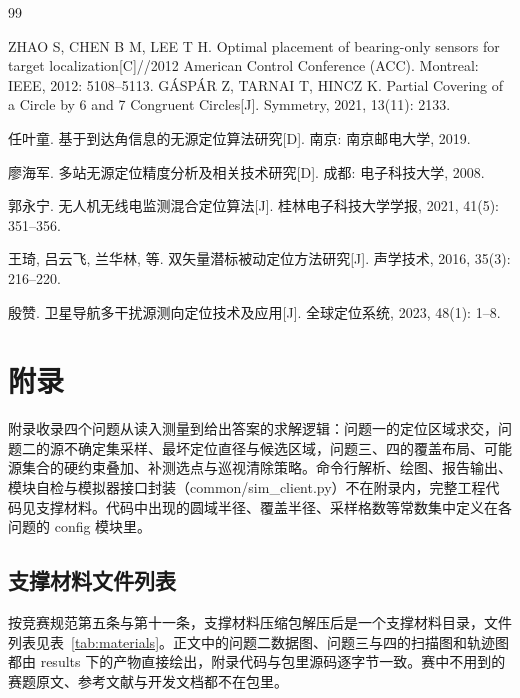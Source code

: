 \documentclass[UTF8, zihao=5,AutoFakeBold=2]{ctexart}
\begin{document}


\newpage
\begin{thebibliography}{99}
    
	 ZHAO S, CHEN B M, LEE T H. Optimal placement of bearing-only sensors for target localization[C]//2012 American Control Conference (ACC). Montreal: IEEE, 2012: 5108--5113.
     GÁSPÁR Z, TARNAI T, HINCZ K. Partial Covering of a Circle by 6 and 7 Congruent Circles[J]. Symmetry, 2021, 13(11): 2133.

	 任叶童. 基于到达角信息的无源定位算法研究[D]. 南京: 南京邮电大学, 2019.

	 廖海军. 多站无源定位精度分析及相关技术研究[D]. 成都: 电子科技大学, 2008.

	 郭永宁. 无人机无线电监测混合定位算法[J]. 桂林电子科技大学学报, 2021, 41(5): 351--356.

	 王琦, 吕云飞, 兰华林, 等. 双矢量潜标被动定位方法研究[J]. 声学技术, 2016, 35(3): 216--220.

	 殷赞. 卫星导航多干扰源测向定位技术及应用[J]. 全球定位系统, 2023, 48(1): 1--8.

\end{thebibliography}

\section*{附录}

	\noindent 附录收录四个问题从读入测量到给出答案的求解逻辑：问题一的定位区域求交，问题二的源不确定集采样、最坏定位直径与候选区域，问题三、四的覆盖布局、可能源集合的硬约束叠加、补测选点与巡视清除策略。命令行解析、绘图、报告输出、模块自检与模拟器接口封装（common/sim\_client.py）不在附录内，完整工程代码见支撑材料。代码中出现的圆域半径、覆盖半径、采样格数等常数集中定义在各问题的 config 模块里。

\subsection*{支撑材料文件列表}

	\noindent 按竞赛规范第五条与第十一条，支撑材料压缩包解压后是一个支撑材料目录，文件列表见表~\ref{tab:materials}。正文中的问题二数据图、问题三与四的扫描图和轨迹图都由 results 下的产物直接绘出，附录代码与包里源码逐字节一致。赛中不用到的赛题原文、参考文献与开发文档都不在包里。
\end{document}
